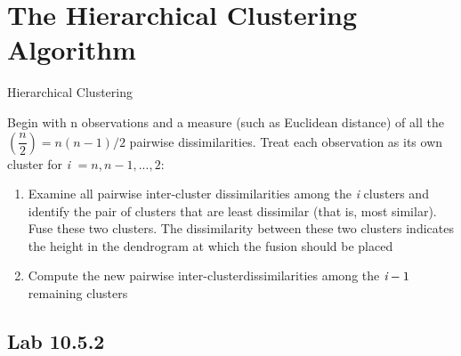 \section{The Hierarchical Clustering Algorithm}
 
 \begin{algorithm}
 	\caption{Hierarchical Clustering}
 	\label{algo:HierarchicalClustering}
 	\begin{algorithmic}[1]
 		\State Begin with n observations and a measure (such as Euclidean distance) of all the $(\dfrac{n}{2}) =n(n-1)/2 $ pairwise dissimilarities. Treat each observation as its own cluster 
 		\State for \emph{i} $= n,n-1,...,2:$
 		\begin{enumerate}[label=(\alph*)]
 			\item Examine all pairwise inter-cluster dissimilarities among the \emph{i} clusters and identify the pair of clusters that are least dissimilar (that is, most similar). Fuse these two clusters. The dissimilarity between these two clusters indicates the height in the dendrogram at which the fusion should be placed 
 			\item Compute the new pairwise inter-clusterdissimilarities among the $\emph{i}-1$ remaining clusters  
 		\end{enumerate}
 	\end{algorithmic}
 \end{algorithm}


\subsection{Lab 10.5.2}